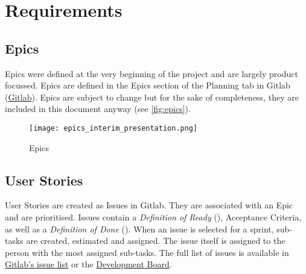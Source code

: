 \section{Requirements}\label{sec:requirements}
\subsection{Epics}\label{subsec:epics}
Epics were defined at the very beginning of the project and are largely product focussed.
Epics are defined in the Epics section of the Planning tab in Gitlab (\href{https://gitlab.ti.bfh.ch/groups/decibel-threshold-event-displayer/-/epics}{Gitlab}). Epics are subject to change
but for the sake of completeness, they are included in this document anyway (see \autoref{fig:epics}).
\begin{figure}[H]
    \centering
    \texttt{[image: epics\_interim\_presentation.png]}
    \caption{Epics}\label{fig:epics}
\end{figure}
\subsection{User Stories}\label{subsec:user-stories}
User Stories are created as Issues in Gitlab.
They are associated with an Epic and are prioritised.
Issues contain a \textit{Definition of Ready} (), Acceptance Criteria, as well as a \textit{Definition of Done} ().
When an issue is selected for a sprint, sub-tasks are created, estimated and assigned.
The issue itself is assigned to the person with the most assigned sub-tasks.
The full list of issues is available in \href{https://gitlab.ti.bfh.ch/groups/decibel-threshold-event-displayer/-/issues}{Gitlab's issue list} or the \href{https://gitlab.ti.bfh.ch/decibel-threshold-event-displayer/decibel-threshold-event-displayer/-/boards/2832}{Development Board}.

